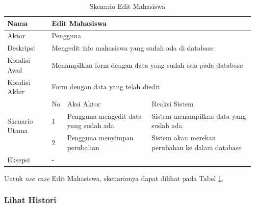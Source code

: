 \begin{table}
\centering
\caption[Tabel Skenario Edit Mahasiswa]{Skenario Edit Mahasiswa}
\label{tab:skenarioedit}
\begin{tabular}{|p{1.4cm}|p{0.4cm}|p{2cm}|p{2cm}|p{2cm}|p{2cm}|}
\hline
Nama & \multicolumn{5}{p{8cm}|}{Edit Mahasiswa} \\ \hline
Aktor & \multicolumn{5}{p{8cm}|}{Pengguna} \\ \hline
Deskripsi & \multicolumn{5}{p{8cm}|}{Mengedit info mahasiswa yang sudah ada di
database} \\ \hline
Kondisi Awal & \multicolumn{5}{p{8cm}|}{Menampilkan form dengan data yang sudah
ada pada database} \\ \hline
Kondisi Akhir & \multicolumn{5}{p{8cm}|}{Form dengan data yang telah diedit} \\
\hline
\multirow{3}{*}{\parbox{1.4cm}{Skenario Utama}} & No &
\multicolumn{2}{p{4cm}|}{Aksi Aktor} & \multicolumn{2}{p{4cm}|}{Reaksi Sistem}
\\ \cline{2-6}
& 1 & \multicolumn{2}{p{4cm}|}{Pengguna mengedit data yang sudah ada} &
\multicolumn{2}{p{4cm}|}{Sistem menampilkan data yang sudah ada} \\ \cline{2-6}
& 2 & \multicolumn{2}{p{4cm}|}{Pengguna menyimpan perubahan} &
\multicolumn{2}{p{4cm}|}{Sistem akan merekan perubahan ke dalam database} \\
\hline
Eksepsi & \multicolumn{5}{p{8cm}|}{-} \\ \hline
\end{tabular}
\end{table}

Untuk {\it use case} Edit Mahasiswa, skenarionya dapat dilihat pada Tabel
\ref{tab:skenarioedit}.

\subsubsection{Lihat Histori}


